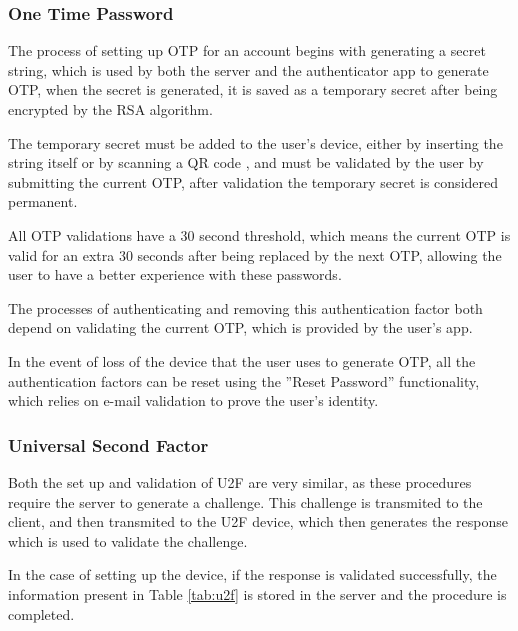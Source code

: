 \subsubsection*{One Time Password}

The process of setting up OTP for an account begins with generating a secret string, which is used by both the server and the authenticator app to generate OTP, when the secret is generated, it is saved as a temporary secret after being encrypted by the RSA algorithm.

The temporary secret must be added to the user's device, either by inserting the string itself or by scanning a QR code \cite{qr}, and must be validated by the user by submitting the current OTP, after validation the temporary secret is considered permanent.

All OTP validations have a 30 second threshold, which means the current OTP is valid for an extra 30 seconds after being replaced by the next OTP, allowing the user to have a better experience with these passwords.

The processes of authenticating and removing this authentication factor both depend on validating the current OTP, which is provided by the user's app.

In the event of loss of the device that the user uses to generate OTP, all the authentication factors can be reset using the ''Reset Password'' functionality, which relies on e-mail validation to prove the user's identity.

\subsubsection*{Universal Second Factor}

Both the set up and validation of U2F are very similar, as these procedures require the server to generate a challenge.
This challenge is transmited to the client, and then transmited to the U2F device, which then generates the response which is used to validate the challenge.

In the case of setting up the device, if the response is validated successfully, the information present in Table \ref{tab:u2f} is stored in the server and the procedure is completed.

